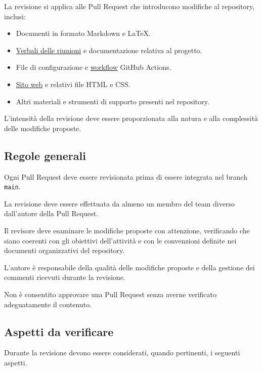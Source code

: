 \documentclass[11pt, a4paper]{article}
\begin{document}
La revisione si applica alle Pull Request che introducono modifiche al repository, inclusi:
\begin{itemize}
    \item Documenti in formato Markdown e LaTeX.
    \item \href{https://github.com/On-By-One-Team/On-By-One.github.io/tree/main/docs/pdf/verbali}{Verbali delle riunioni} e documentazione relativa al progetto.
    \item File di configurazione e \href{https://github.com/On-By-One-Team/On-By-One.github.io/tree/main/.github/workflows}{workflow} GitHub Actions.
    \item \href{https://on-by-one-team.github.io/On-By-One.github.io/}{Sito web} e relativi file HTML e CSS.
    \item Altri materiali e strumenti di supporto presenti nel repository.
\end{itemize}

\noindent L'intensità della revisione deve essere proporzionata alla natura e alla complessità delle modifiche proposte.

\subsection{Regole generali}
\label{subsec:regole-generali}

Ogni Pull Request deve essere revisionata prima di essere integrata nel branch \texttt{main}.

La revisione deve essere effettuata da almeno un membro del team diverso dall'autore della Pull Request.

Il revisore deve esaminare le modifiche proposte con attenzione, verificando che siano coerenti con gli obiettivi dell'attività e con le convenzioni definite nei documenti organizzativi del repository.

L'autore è responsabile della qualità delle modifiche proposte e della gestione dei commenti ricevuti durante la revisione.

Non è consentito approvare una Pull Request senza averne verificato adeguatamente il contenuto.

\subsection{Aspetti da verificare}

Durante la revisione devono essere considerati, quando pertinenti, i seguenti aspetti.
\end{document}

